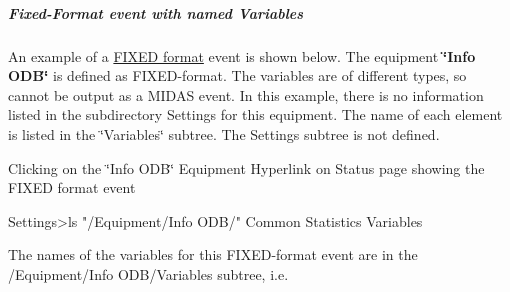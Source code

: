 \par


\par
\hypertarget{RC_mhttpd_Equipment_page_RC_mhttpd_Equipment_example6}{}\subparagraph{Fixed-\/Format event with named Variables}\label{RC_mhttpd_Equipment_page_RC_mhttpd_Equipment_example6}
An example of a \hyperlink{FE_bank_construction_FE_FIXED_event_readout}{FIXED format} event is shown below. The equipment {\bfseries \char`\"{}Info ODB\char`\"{}} is defined as FIXED-\/format. The variables are of different types, so cannot be output as a MIDAS event. In this example, there is no information listed in the subdirectory Settings for this equipment. The name of each element is listed in the \char`\"{}Variables\char`\"{} subtree. The Settings subtree is not defined.

\par
\par
\par
 \begin{center}  Clicking on the \char`\"{}Info ODB\char`\"{} Equipment Hyperlink on Status page showing the FIXED format event \par
\par
\par
  \end{center}  \par
\par
\par



\begin{DoxyCode}
Settings>ls "/Equipment/Info ODB/"
Common
Statistics
Variables
\end{DoxyCode}


The names of the variables for this FIXED-\/format event are in the /Equipment/Info ODB/Variables subtree, i.e.


